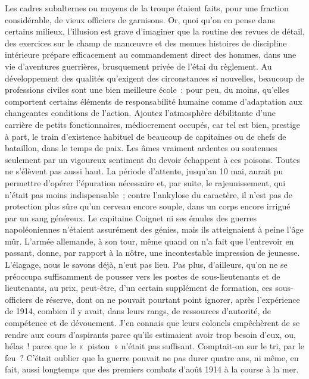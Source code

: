 \documentclass[french,twoside]{book} %
\begin{document}
Les cadres subalternes ou moyens de la troupe étaient faits, pour une fraction considérable, de vieux officiers de garnisons. Or, quoi qu’on en pense dans certains milieux, l’illusion est grave d’imaginer que la routine des revues de détail, des exercices sur le champ de manœuvre et des menues histoires de discipline intérieure prépare efficacement au commandement direct des hommes, dans une vie d’aventures guerrières, brusquement privée de l’étai du règlement. Au développement des qualités qu’exigent des circonstances si nouvelles, beaucoup de professions civiles sont une bien meilleure école : pour peu, du moins, qu’elles comportent certains éléments de responsabilité humaine comme d’adaptation aux changeantes conditions de l’action. Ajoutez l’atmosphère débilitante d’une carrière de petits fonctionnaires, médiocrement occupés, car tel est bien, prestige à part, le train d’existence habituel de beaucoup de capitaines ou de chefs de bataillon, dans le temps de   paix. Les âmes vraiment ardentes ou soutenues seulement par un vigoureux sentiment du devoir échappent à ces poisons. Toutes ne s’élèvent pas aussi haut. La période d’attente, jusqu’au 10 mai, aurait pu permettre d’opérer l’épuration nécessaire et, par suite, le rajeunissement, qui n’était pas moins indispensable ; contre l’ankylose du caractère, il n’est pas de protection plus sûre qu’un cerveau encore souple, dans un corps encore irrigué par un sang généreux. Le capitaine Coignet ni ses émules des guerres napoléoniennes n’étaient assurément des génies, mais ils atteignaient à peine l’âge mûr. L’armée allemande, à son tour, même quand on n’a fait que l’entrevoir en passant, donne, par rapport à la nôtre, une incontestable impression de jeunesse. L’élagage, nous le savons déjà, n’eut pas lieu. Pas plus, d’ailleurs, qu’on ne se préoccupa suffisamment de pousser vers les postes de sous-lieutenants et de lieutenants, au prix, peut-être, d’un certain supplément de formation, ces sous-officiers de réserve, dont on ne pouvait pourtant point ignorer, après l’expérience de 1914, combien il y avait, dans leurs rangs, de ressources d’autorité, de compétence et de dévouement. J’en connais que leurs colonels empêchèrent de se rendre aux cours d’aspirants parce qu’ils estimaient avoir trop besoin d’eux, ou, hélas ! parce que le « piston » n’était pas suffisant. Comptait-on sur le tri, par le feu ? C’était oublier que la guerre pouvait ne pas durer quatre ans, ni même, en fait, aussi longtemps que des premiers combats d’août 1914 à la course à la mer.\par
\end{document}
